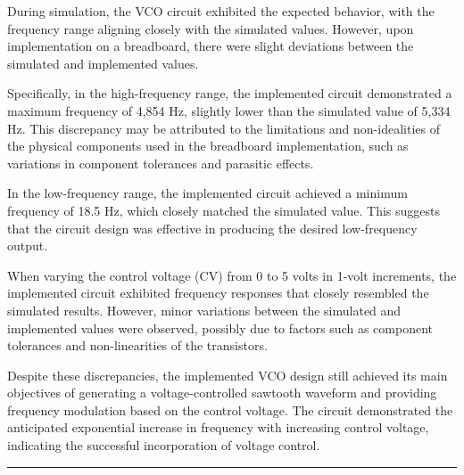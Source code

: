 \documentclass{article}
\begin{document}
During simulation, the VCO circuit exhibited the expected behavior, with the frequency range aligning closely with the simulated values. However, upon implementation on a breadboard, there were slight deviations between the simulated and implemented values.

Specifically, in the high-frequency range, the implemented circuit demonstrated a maximum frequency of 4,854 Hz, slightly lower than the simulated value of 5,334 Hz. This discrepancy may be attributed to the limitations and non-idealities of the physical components used in the breadboard implementation, such as variations in component tolerances and parasitic effects.

In the low-frequency range, the implemented circuit achieved a minimum frequency of 18.5 Hz, which closely matched the simulated value. This suggests that the circuit design was effective in producing the desired low-frequency output.

When varying the control voltage (CV) from 0 to 5 volts in 1-volt increments, the implemented circuit exhibited frequency responses that closely resembled the simulated results. However, minor variations between the simulated and implemented values were observed, possibly due to factors such as component tolerances and non-linearities of the transistors.

Despite these discrepancies, the implemented VCO design still achieved its main objectives of generating a voltage-controlled sawtooth waveform and providing frequency modulation based on the control voltage. The circuit demonstrated the anticipated exponential increase in frequency with increasing control voltage, indicating the successful incorporation of voltage control.
\vspace{5mm}
\hrule
\end{document}
